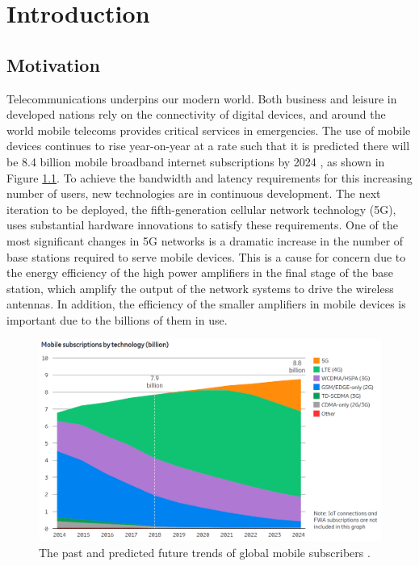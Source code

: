 \documentclass[../thesis/thesis.tex]{subfiles}
\begin{document}
\chapter{Introduction}
\section{Motivation}

Telecommunications underpins our modern world. Both business and leisure in developed nations rely on the connectivity of digital devices, and around the world mobile telecoms provides critical services in emergencies. The use of mobile devices continues to rise year-on-year at a rate such that it is predicted there will be 8.4 billion mobile broadband internet subscriptions by 2024 \cite{Ericsson_2019}, as shown in Figure \ref{ch1_fig_ericsson}. To achieve the bandwidth and latency requirements for this increasing number of users, new technologies are in continuous development. The next iteration to be deployed, the fifth-generation cellular network technology (5G), uses substantial hardware innovations to satisfy these requirements. One of the most significant changes in 5G networks is a dramatic increase in the number of base stations required to serve mobile devices. This is a cause for concern due to the energy efficiency of the high power amplifiers in the final stage of the base station, which amplify the output of the network systems to drive the wireless antennas. In addition, the efficiency of the smaller amplifiers in mobile devices is important due to the billions of them in use.

\begin{figure}
	\centering
	\includegraphics[width=\textwidth]{ch1_ericsson}
	\caption{The past and predicted future trends of global mobile subscribers \cite{Ericsson_2019}.}
	\label{ch1_fig_ericsson}
\end{figure}
\end{document}
